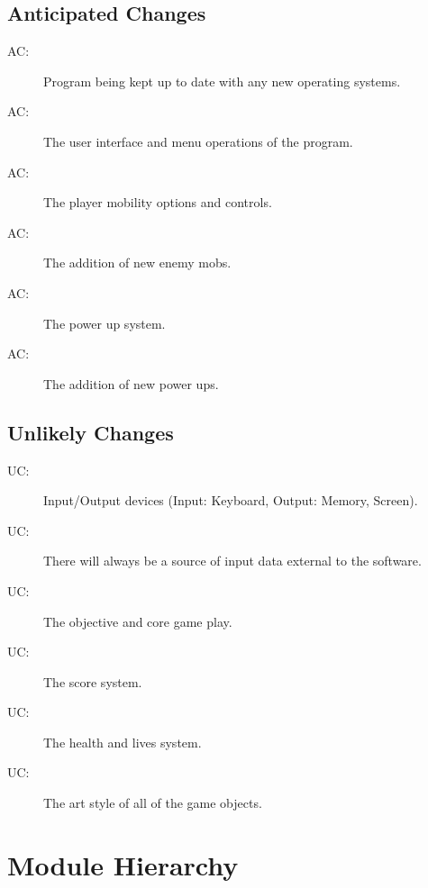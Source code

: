 \documentclass[12pt, titlepage]{article}
\newcounter{acnum}
\newcommand{\actheacnum}{AC\theacnum}
\newcounter{ucnum}
\newcommand{\uctheucnum}{UC\theucnum}
\begin{document}
\subsection{Anticipated Changes} \label{SecAchange}

\begin{description}
\item[ \actheacnum \label{acOS}:] Program being kept up to date with any new operating systems.
\item[ \actheacnum \label{acUI}:] The user interface and menu operations of the program.
\item[ \actheacnum \label{acMobility}:] The player mobility options and controls. 
\item[ \actheacnum \label{acEnemy}:] The addition of new enemy mobs.
\item[ \actheacnum \label{acPowerSys}:] The power up system.
\item[ \actheacnum \label{acPowerUps}:] The addition of new power ups.
\end{description}

\subsection{Unlikely Changes} \label{SecUchange}


\begin{description}
\item[ \uctheucnum \label{ucIO}:] Input/Output devices (Input: Keyboard, Output: Memory, Screen).
\item[ \uctheucnum \label{ucInput}:] There will always be
  a source of input data external to the software.
\item[ \uctheucnum \label{ucIO}:] The objective and core game play. 
\item[ \uctheucnum \label{ucIO}:] The score system. 
\item[ \uctheucnum \label{ucInput}:] The health and lives system. 
\item[ \uctheucnum \label{ucInput}:] The art style of all of the game objects. 
\end{description}

\section{Module Hierarchy} \label{SecMH}
\end{document}
